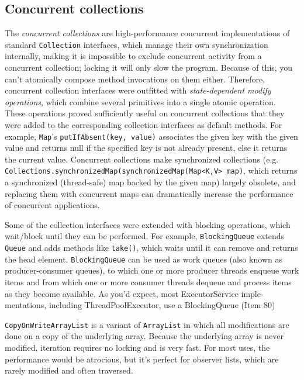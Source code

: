 \documentclass[8pt, table, xcdraw]{article}%
\begin{document}
\subsection{Concurrent collections}

The \emph{concurrent collections} are high-performance concurrent implementations of standard \lstinline{Collection} interfaces, which manage their own synchronization internally, making it is impossible to exclude concurrent activity from a concurrent collection; locking it will only slow the program. Because of this, you can’t atomically compose method invocations on them either. Therefore, concurrent collection interfaces were outfitted with \emph{state-dependent modify operations}, which combine several primitives into a single atomic operation. These operations proved sufficiently useful on concurrent collections that they were added to the corresponding collection interfaces as default methods. For example, \lstinline{Map}’s \lstinline{putIfAbsent(key, value)} associates the given key with the given value and returns null if the specified key is not already present, else it returns the current value. Concurrent collections make synchronized collections (e.g. \lstinline{Collections.synchronizedMap(synchronizedMap(Map<K,V> map)}, which returns a synchronized (thread-safe) map backed by the given map) largely obsolete, and replacing them with concurrent maps can dramatically increase the performance of concurrent applications.

Some of the collection interfaces were extended with blocking operations, which wait/block until they can be performed. For example,
\lstinline{BlockingQueue} extends \lstinline{Queue} and adds methods like \lstinline{take()}, which waits until it can remove and returns the head element. \lstinline{BlockingQueue} can be used as work queues (also known as producer-consumer queues), to which one or more producer threads enqueue
work items and from which one or more consumer threads dequeue and process
items as they become available. As you’d expect, most ExecutorService imple-
mentations, including ThreadPoolExecutor, use a BlockingQueue (Item 80)

\lstinline{CopyOnWriteArrayList} is a variant of \lstinline{ArrayList} in which all modifications are done on a copy of the underlying array. Because the underlying array is never modified, iteration requires no locking and is very fast. For most uses, the performance would be atrocious, but it’s perfect for observer lists, which are rarely modified and often traversed.
\end{document}
